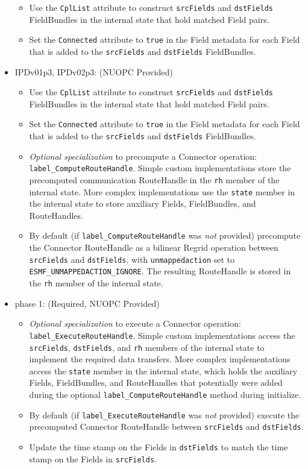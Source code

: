 \begin{itemize}
\begin{itemize}
  \item Use the {\tt CplList} attribute to construct {\tt srcFields} and {\tt dstFields} FieldBundles in the internal state that hold matched Field pairs.
  \item Set the {\tt Connected} attribute to {\tt true} in the Field metadata for each Field that is added to the {\tt srcFields} and {\tt dstFields} FieldBundles.
  \end{itemize}  
\item IPDv01p3, IPDv02p3: ({\sc NUOPC Provided})
  \begin{itemize}
  \item Use the {\tt CplList} attribute to construct {\tt srcFields} and {\tt dstFields} FieldBundles in the internal state that hold matched Field pairs.
  \item Set the {\tt Connected} attribute to {\tt true} in the Field metadata for each Field that is added to the {\tt srcFields} and {\tt dstFields} FieldBundles.
  \item {\it Optional specialization} to precompute a Connector operation: {\tt label\_ComputeRouteHandle}. Simple custom implementations store the precomputed communication RouteHandle in the {\tt rh} member of the internal state. More complex implementations use the {\tt state} member in the internal state to store auxiliary Fields, FieldBundles, and RouteHandles.
  \item By default (if {\tt label\_ComputeRouteHandle} was {\em not} provided) precompute the Connector RouteHandle as a bilinear Regrid operation between {\tt srcFields} and {\tt dstFields}, with {\tt unmappedaction} set to {\tt ESMF\_UNMAPPEDACTION\_IGNORE}. The resulting RouteHandle is stored in the {\tt rh} member of the internal state.
  \end{itemize}  
\end{itemize}

\begin{itemize}
\item phase 1: ({\sc Required, NUOPC Provided})
  \begin{itemize}
  \item {\it Optional specialization} to execute a Connector operation: {\tt label\_ExecuteRouteHandle}. Simple custom implementations access the {\tt srcFields}, {\tt dstFields}, and {\tt rh} members of the internal state to implement the required data transfers. More complex implementations access the {\tt state} member in the internal state, which holds the auxiliary Fields, FieldBundles, and RouteHandles that potentially were added during the optional {\tt label\_ComputeRouteHandle} method during initialize.
  \item By default (if {\tt label\_ExecuteRouteHandle} was {\em not} provided) execute the precomputed Connector RouteHandle between {\tt srcFields} and {\tt dstFields}.
  \item Update the time stamp on the Fields in {\tt dstFields} to match the time stamp on the Fields in {\tt srcFields}.
  \end{itemize}    
\end{itemize}

